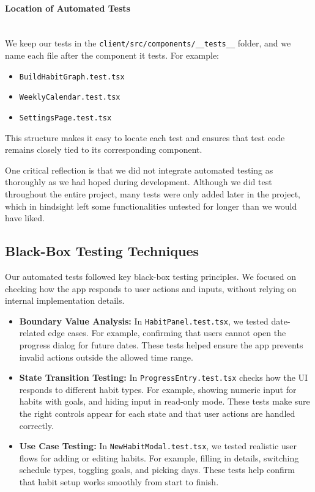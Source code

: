 \paragraph{Location of Automated Tests}\mbox{}\\

We keep our tests in the \texttt{client/src/components/\_\_tests\_\_} folder, and we name each file after the component it tests. For example:

\begin{itemize} \item \texttt{BuildHabitGraph.test.tsx}\item \texttt{WeeklyCalendar.test.tsx} \item \texttt{SettingsPage.test.tsx} \end{itemize}

This structure makes it easy to locate each test and ensures that test code remains closely tied to its corresponding component.

One critical reflection is that we did not integrate automated testing as thoroughly as we had hoped during development. Although we did test throughout the entire project, many tests were only added later in the project, which in hindsight left some functionalities untested for longer than we would have liked.

\subsection{Black-Box Testing Techniques}
Our automated tests followed key black-box testing principles. We focused on checking how the app responds to user actions and inputs, without relying on internal implementation details.

\begin{itemize}

\item \textbf{Boundary Value Analysis:}
In \texttt{HabitPanel.test.tsx}, we tested date-related edge cases. For example, confirming that users cannot open the progress dialog for future dates. These tests helped ensure the app prevents invalid actions outside the allowed time range.

\item \textbf{State Transition Testing:}  
In \texttt{ProgressEntry.test.tsx} checks how the UI responds to different habit types. For example, showing numeric input for habits with goals, and hiding input in read-only mode. These tests make sure the right controls appear for each state and that user actions are handled correctly.

\item \textbf{Use Case Testing:}  
In \texttt{NewHabitModal.test.tsx}, we tested realistic user flows for adding or editing habits. For example, filling in details, switching schedule types, toggling goals, and picking days. These tests help confirm that habit setup works smoothly from start to finish.

\end{itemize}

